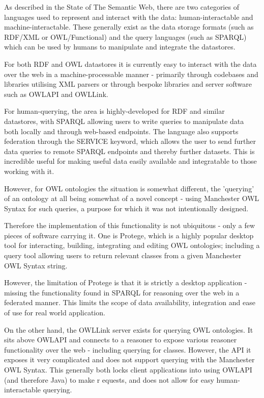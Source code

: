 \documentclass{article}
\begin{document}
As described in the State of The Semantic Web, there are two categories of
languages used to represent and interact with the data: human-interactable and
machine-interactable. These generally exist as the data storage formats (such as
RDF/XML or OWL/Functional) and the query languages (such as SPARQL) which can be 
used by humans to manipulate and integrate the datastores.

For both RDF and OWL datastores it is currently easy to interact with the data
over the web in a machine-processable manner - primarily through codebases and
libraries utilising XML parsers or through bespoke libraries and server software 
such as OWLAPI and OWLLink.

For human-querying, the area is highly-developed for RDF and similar datastores, 
with SPARQL allowing users to write queries to manipulate data both locally and
through web-based endpoints. The language also supports federation through the
SERVICE keyword, which allows the user to send further data queries to remote
SPARQL endpoints and thereby further datasets.\cite{sservice} This is incredible useful for
making useful data easily available and integratable to those working with it.

However, for OWL ontologies the situation is somewhat different, the 'querying'
of an ontology at all being somewhat of a novel concept - using Manchester OWL
Syntax for such queries, a purpose for which it was not intentionally designed.

Therefore the implementation of this functionality is not ubiquitous - only a
few pieces of software carrying it. One is Protege, which is a highly popular
desktop tool for interacting, building, integrating and editing OWL ontologies;
including a query tool allowing users to return relevant classes from a given
Manchester OWL Syntax string. 

However, the limitation of Protege is that it is strictly a desktop application
- missing the functionality found in SPARQL for reasoning over the web in a
federated manner. This limits the scope of data availability, integration and
ease of use for real world application. 

On the other hand, the OWLLink server exists for querying OWL ontologies. It
sits above OWLAPI and connects to a reasoner to expose various reasoner
functionality over the web - including querying for classes. However, the API it
exposes it very complicated and does not support querying with the Manchester
OWL Syntax. This generally
both locks client applications into using OWLAPI (and therefore Java) to make r
equests, and does not allow for easy human-interactable querying. 
\end{document}
